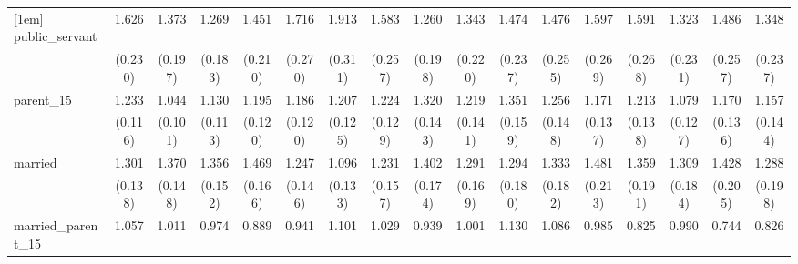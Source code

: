 {\begin{tabular}{l*{16}{c}}
[1em]
public\_servant      &       1.626\sym{***}&       1.373\sym{*}  &       1.269         &       1.451\sym{*}  &       1.716\sym{***}&       1.913\sym{***}&       1.583\sym{**} &       1.260         &       1.343         &       1.474\sym{*}  &       1.476\sym{*}  &       1.597\sym{**} &       1.591\sym{**} &       1.323         &       1.486\sym{*}  &       1.348         \\
                    &     (0.230)         &     (0.197)         &     (0.183)         &     (0.210)         &     (0.270)         &     (0.311)         &     (0.257)         &     (0.198)         &     (0.220)         &     (0.237)         &     (0.255)         &     (0.269)         &     (0.268)         &     (0.231)         &     (0.257)         &     (0.237)         \\
[1em]
parent\_15           &       1.233\sym{*}  &       1.044         &       1.130         &       1.195         &       1.186         &       1.207         &       1.224         &       1.320\sym{*}  &       1.219         &       1.351\sym{*}  &       1.256         &       1.171         &       1.213         &       1.079         &       1.170         &       1.157         \\
                    &     (0.116)         &     (0.101)         &     (0.113)         &     (0.120)         &     (0.120)         &     (0.125)         &     (0.129)         &     (0.143)         &     (0.141)         &     (0.159)         &     (0.148)         &     (0.137)         &     (0.138)         &     (0.127)         &     (0.136)         &     (0.144)         \\
[1em]
married             &       1.301\sym{*}  &       1.370\sym{**} &       1.356\sym{**} &       1.469\sym{***}&       1.247         &       1.096         &       1.231         &       1.402\sym{**} &       1.291         &       1.294         &       1.333\sym{*}  &       1.481\sym{**} &       1.359\sym{*}  &       1.309         &       1.428\sym{*}  &       1.288         \\
                    &     (0.138)         &     (0.148)         &     (0.152)         &     (0.166)         &     (0.146)         &     (0.133)         &     (0.157)         &     (0.174)         &     (0.169)         &     (0.180)         &     (0.182)         &     (0.213)         &     (0.191)         &     (0.184)         &     (0.205)         &     (0.198)         \\
[1em]
married\_parent\_15   &       1.057         &       1.011         &       0.974         &       0.889         &       0.941         &       1.101         &       1.029         &       0.939         &       1.001         &       1.130         &       1.086         &       0.985         &       0.825         &       0.990         &       0.744         &       0.826         \\

\end{tabular}}
